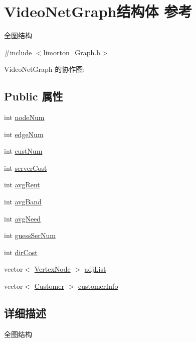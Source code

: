\hypertarget{struct_video_net_graph}{}\section{Video\+Net\+Graph结构体 参考}
\label{struct_video_net_graph}


全图结构  




{\ttfamily \#include $<$limorton\+\_\+\+Graph.\+h$>$}



Video\+Net\+Graph 的协作图\+:
\subsection*{Public 属性}
\begin{DoxyCompactItemize}
\item 
int \hyperlink{struct_video_net_graph_aa28dbb6f5bba2d61fd8e2639151d7b73}{node\+Num}
\item 
int \hyperlink{struct_video_net_graph_ac15308be07d7bc70a102bf653efa8226}{edge\+Num}
\item 
int \hyperlink{struct_video_net_graph_a83888f89f10ea54a23062f8a2e183b40}{cust\+Num}
\item 
int \hyperlink{struct_video_net_graph_a9b9eb7b8ecf68a7bc4fd2d3f1ebaf610}{server\+Cost}
\item 
int \hyperlink{struct_video_net_graph_a0d2edc53678532a3d23607ee07d7eb7e}{avg\+Rent}
\item 
int \hyperlink{struct_video_net_graph_aa16d8259fa0cdec0afd8bd88a4a9dc6e}{avg\+Band}
\item 
int \hyperlink{struct_video_net_graph_aca35568b865f13bd5bf101be77d0e87b}{avg\+Need}
\item 
int \hyperlink{struct_video_net_graph_ac2768170269e6989614cf28e576a814a}{guess\+Ser\+Num}
\item 
int \hyperlink{struct_video_net_graph_a4f8831f55885d08ebec1886e025115c6}{dir\+Cost}
\item 
vector$<$ \hyperlink{struct_vertex_node}{Vertex\+Node} $>$ \hyperlink{struct_video_net_graph_ac38cc11712995b947bb7f0550a718bbc}{adj\+List}
\item 
vector$<$ \hyperlink{struct_customer}{Customer} $>$ \hyperlink{struct_video_net_graph_a0fbde9715efc15015e49ee40a6706a9f}{customer\+Info}
\end{DoxyCompactItemize}


\subsection{详细描述}
全图结构 

